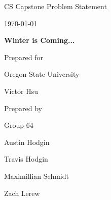 \documentclass[onecolumn, draftclsnofoot,10pt, compsoc]{IEEEtran}
\def \CapstoneTeamName{			              The Party Parrots}
\def \CapstoneTeamNumber{					            64}
\def \GroupMemberOne{				            Austin Hodgin}
\def \GroupMemberTwo{				            Travis Hodgin}
\def \GroupMemberThree{			            Maximillian Schmidt}
\def\GroupMemberFour{		        	                Zach Lerew}
\def \CapstoneProjectName{	      	             Winter is Coming...}
\def \CapstoneSponsorCompany{		      Oregon State University }
\def \CapstoneSponsorPerson{		 			  Victor Hsu}
\def \DocType{		Problem Statement
				}
\newcommand{\NameSigPair}[1]{\par
\makebox[2.75in][r]{#1} \hfil 	\makebox[3.25in]{\makebox[2.25in]{\hrulefill} \hfill		\makebox[.75in]{\hrulefill}}
\par\vspace{-12pt} \textit{\tiny\noindent
\makebox[2.75in]{} \hfil		\makebox[3.25in]{\makebox[2.25in][r]{Signature} \hfill	\makebox[.75in][r]{Date}}}}
\renewcommand{\NameSigPair}[1]{#1}
\begin{document}
\begin{titlepage}
    \begin{singlespace}
        \hfill
        \par\vspace{.2in}
        \centering
        \scshape{
            \huge CS Capstone \DocType \par
            {\large\today}\par
            \vspace{.5in}
            \textbf{\Huge\CapstoneProjectName}\par
						\vspace{1in}
            {\large Prepared for}\par
            \Huge \CapstoneSponsorCompany\par
            \vspace{5pt}
            {\Large\NameSigPair{\CapstoneSponsorPerson}\par}
            {\large Prepared by }\par
            Group\CapstoneTeamNumber\par
            \vspace{5pt}
            {\Large
                \NameSigPair{\GroupMemberOne}\par
            	 \NameSigPair{\GroupMemberTwo}\par
                 \NameSigPair{\GroupMemberThree}\par
		 \NameSigPair{\GroupMemberFour}\par

}}
\end{singlespace}
\end{titlepage}
\end{document}
